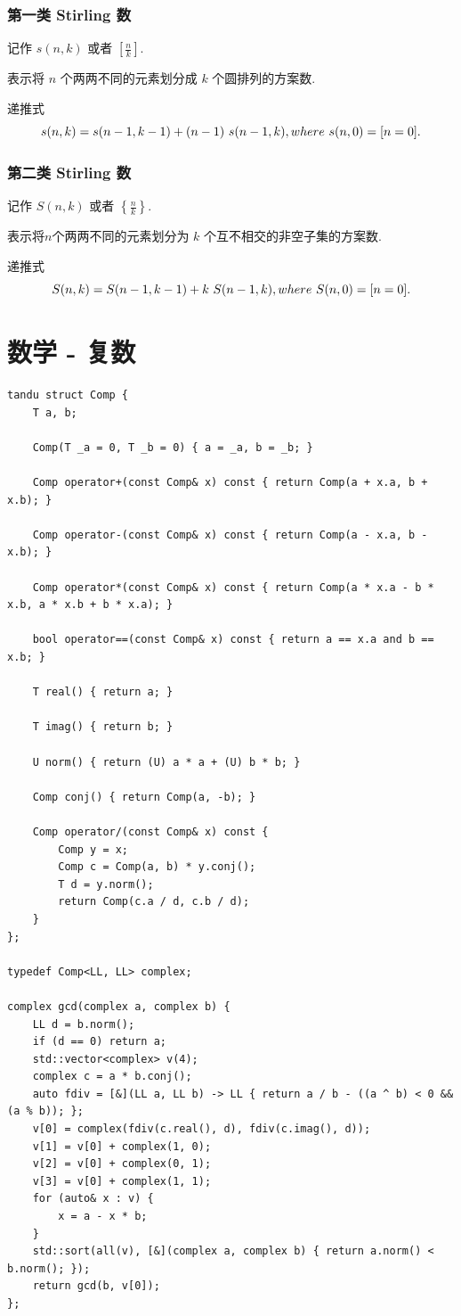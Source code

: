 \documentclass[UTF8, a4paper, titlepage, twoside]{ctexart}
\begin{document}
\subsubsection{ 第一类 Stirling 数 }

记作 $s(n, k)$ 或者 $\left[ \frac{n}{k} \right]$.

表示将 $n$ 个两两不同的元素划分成 $k$ 个圆排列的方案数.

递推式
$$
s(n, k) = s(n - 1, k - 1) + (n - 1) \ s(n - 1, k), \\
where \ s(n, 0) = [n = 0].
$$

\subsubsection{ 第二类 Stirling 数 }

记作 $S(n, k)$ 或者 $\left \{ \frac{n}{k} \right \}$.

表示将$n$个两两不同的元素划分为 $k$ 个互不相交的非空子集的方案数.

递推式
$$
S(n, k) = S(n - 1, k - 1) + k \ S(n - 1, k), \\
where \ S(n, 0) = [n = 0].
$$

\newpage
\section{ 数学 - 复数 }
\begin{lstlisting}
tandu struct Comp {
    T a, b;

    Comp(T _a = 0, T _b = 0) { a = _a, b = _b; }

    Comp operator+(const Comp& x) const { return Comp(a + x.a, b + x.b); }

    Comp operator-(const Comp& x) const { return Comp(a - x.a, b - x.b); }

    Comp operator*(const Comp& x) const { return Comp(a * x.a - b * x.b, a * x.b + b * x.a); }

    bool operator==(const Comp& x) const { return a == x.a and b == x.b; }

    T real() { return a; }

    T imag() { return b; }

    U norm() { return (U) a * a + (U) b * b; }

    Comp conj() { return Comp(a, -b); }

    Comp operator/(const Comp& x) const {
        Comp y = x;
        Comp c = Comp(a, b) * y.conj();
        T d = y.norm();
        return Comp(c.a / d, c.b / d);
    }
};

typedef Comp<LL, LL> complex;

complex gcd(complex a, complex b) {
    LL d = b.norm();
    if (d == 0) return a;
    std::vector<complex> v(4);
    complex c = a * b.conj();
    auto fdiv = [&](LL a, LL b) -> LL { return a / b - ((a ^ b) < 0 && (a % b)); };
    v[0] = complex(fdiv(c.real(), d), fdiv(c.imag(), d));
    v[1] = v[0] + complex(1, 0);
    v[2] = v[0] + complex(0, 1);
    v[3] = v[0] + complex(1, 1);
    for (auto& x : v) {
        x = a - x * b;
    }
    std::sort(all(v), [&](complex a, complex b) { return a.norm() < b.norm(); });
    return gcd(b, v[0]);
};
\end{lstlisting}
\end{document}
